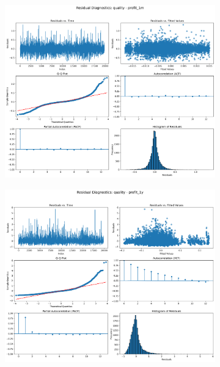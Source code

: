 \documentclass[11pt,english,a4paper,hidelinks]{book}
\begin{document}
\begin{figure}[H]
    \centering
    \begin{subfigure}[b]{0.32\textwidth}
        \centering
        \includegraphics[width=\textwidth]{images/code/models/linear_regression/first_model/LAT/quality_profit_1m_residuals.png}
    \end{subfigure}
    \hfill
    \begin{subfigure}[b]{0.32\textwidth}
        \centering
        \includegraphics[width=\textwidth]{images/code/models/linear_regression/first_model/LAT/quality_profit_1y_residuals.png}

\end{subfigure}
\end{figure}
\end{document}
